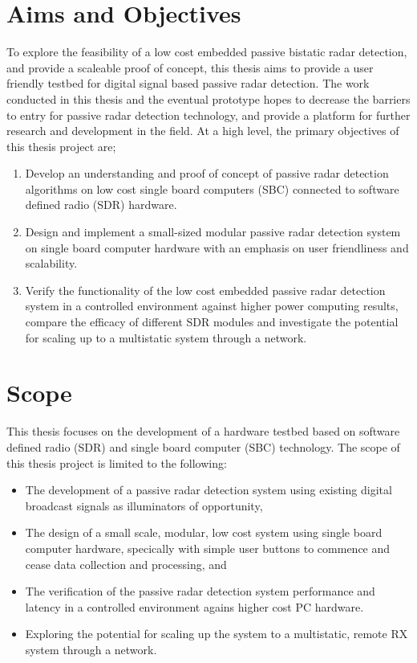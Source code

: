 \section{Aims and Objectives} \label{sec:aims}
To explore the feasibility of a low cost embedded passive bistatic radar detection, and provide a scaleable proof of concept, this thesis aims to provide a user friendly testbed for digital signal based passive radar detection. The work conducted in this thesis and the eventual prototype hopes to decrease the barriers to entry for passive radar detection technology, and provide a platform for further research and development in the field. At a high level, the primary objectives of this thesis project are;
\begin{enumerate}
    \item Develop an understanding and proof of concept of passive radar detection algorithms on low cost single board computers (SBC) connected to software defined radio (SDR) hardware.
    \item Design and implement a small-sized modular passive radar detection system on single board computer hardware with an emphasis on user friendliness and scalability.
    \item Verify the functionality of the low cost embedded passive radar detection system in a controlled environment against higher power computing results, compare the efficacy of different SDR modules and investigate the potential for scaling up to a multistatic system through a network. 
\end{enumerate}

\section{Scope}
This thesis focuses on the development of a hardware testbed based on software defined radio (SDR) and single board computer (SBC) technology. The scope of this thesis project is limited to the following:

\begin{itemize}
    \item The development of a passive radar detection system using existing digital broadcast signals as illuminators of opportunity,
    \item The design of a small scale, modular, low cost system using single board computer hardware, specically with simple user buttons to commence and cease data collection and processing, and 
    \item The verification of the passive radar detection system performance and latency in a controlled environment agains higher cost PC hardware.
    \item Exploring the potential for scaling up the system to a multistatic, remote RX system through a network.
\end{itemize}

